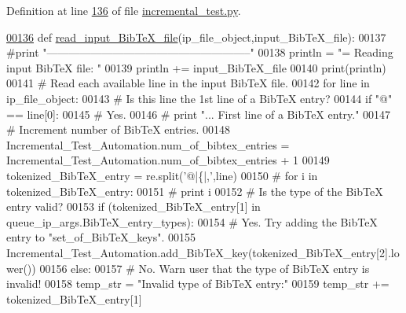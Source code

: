 Definition at line \hyperlink{incremental__test_8py_source_l00136}{136} of file \hyperlink{incremental__test_8py_source}{incremental\+\_\+test.\+py}.


\begin{DoxyCode}
\hypertarget{classincremental__test_1_1Incremental__Test__Automation_l00136}{}\hyperlink{classincremental__test_1_1Incremental__Test__Automation_a7cec6a541c4680c857a699dbe363ffbd}{00136}     \textcolor{keyword}{def }\hyperlink{classincremental__test_1_1Incremental__Test__Automation_a7cec6a541c4680c857a699dbe363ffbd}{read\_input\_BibTeX\_file}(ip\_file\_object,input\_BibTeX\_file):
00137         \textcolor{comment}{#print "--------------------------------------------------------"}
00138         println = \textcolor{stringliteral}{"=    Reading input BibTeX file: "}
00139         println += input\_BibTeX\_file
00140         print(println)
00141         \textcolor{comment}{# Read each available line in the input BibTeX file.}
00142         \textcolor{keywordflow}{for} line \textcolor{keywordflow}{in} ip\_file\_object:
00143             \textcolor{comment}{# Is this line the 1st line of a BibTeX entry?}
00144             \textcolor{keywordflow}{if} \textcolor{stringliteral}{"@"} == line[0]:
00145                 \textcolor{comment}{# Yes.}
00146 \textcolor{comment}{#               print "...  First line of a BibTeX entry."}
00147                 \textcolor{comment}{# Increment number of BibTeX entries.}
00148                 Incremental\_Test\_Automation.num\_of\_bibtex\_entries = 
      Incremental\_Test\_Automation.num\_of\_bibtex\_entries + 1
00149                 tokenized\_BibTeX\_entry = re.split(\textcolor{stringliteral}{'@|\{|,'},line)
00150 \textcolor{comment}{#               for i in tokenized\_BibTeX\_entry:}
00151 \textcolor{comment}{#                   print i}
00152                 \textcolor{comment}{# Is the type of the BibTeX entry valid?}
00153                 \textcolor{keywordflow}{if} (tokenized\_BibTeX\_entry[1] \textcolor{keywordflow}{in} queue\_ip\_args.BibTeX\_entry\_types):
00154                     \textcolor{comment}{# Yes. Try adding the BibTeX entry to "set\_of\_BibTeX\_keys".}
00155                     Incremental\_Test\_Automation.add\_BibTeX\_key(tokenized\_BibTeX\_entry[2].lower())
00156                 \textcolor{keywordflow}{else}:
00157                     \textcolor{comment}{# No. Warn user that the type of BibTeX entry is invalid!}
00158                     temp\_str = \textcolor{stringliteral}{"Invalid type of BibTeX entry:"}
00159                     temp\_str += tokenized\_BibTeX\_entry[1]

\end{DoxyCode}
